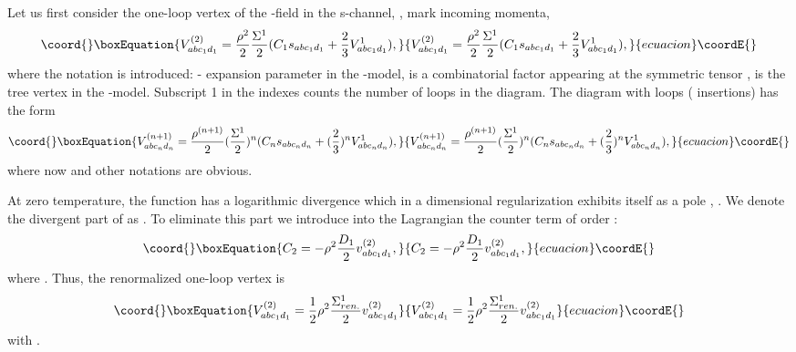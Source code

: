 \documentclass[a4paper,12pt]{article}
\begin{document}
Let us first consider the one-loop vertex of the \myHighlight{$\phi$}\coordHE{}-field in the
s-channel, \coordHE{}, \coordHE{} mark incoming momenta,
\begin{equation}\coord{}\boxEquation{ \label{v1}
V^{(2)}_{abc_1 d_1} = \frac{\rho^2 }{2}\frac{ \Sigma^1}{2} (C_1
s_{abc_1 d_1} + \frac{2}{3} V^1 _{abc_1 d_1}),
}{ V^{(2)}_{abc_1 d_1} = \frac{\rho^2 }{2}\frac{ \Sigma^1}{2} (C_1
s_{abc_1 d_1} + \frac{2}{3} V^1 _{abc_1 d_1}),
}{ecuacion}\coordE{}\end{equation}
where the notation is introduced: \coordHE{} -
expansion parameter in the \coordHE{}-model, \coordHE{} is a combinatorial factor appearing at
the symmetric tensor \coordHE{}, \coordHE{} is the tree vertex in the \coordHE{}-model. Subscript 1
in the indexes \coordHE{} counts the number of loops in the
diagram. The diagram with \coordHE{} loops ( \coordHE{}
insertions) has the form
\begin{equation}\coord{}\boxEquation{ \label{vn}
V^{(n+1)}_{abc_n d_n} = \frac{\rho^{(n+1)} }{2}(\frac{ \Sigma^1}{2})^n
(C_n s_{abc_n d_n} + (\frac{2}{3})^n V^1 _{abc_n d_n}),
}{ V^{(n+1)}_{abc_n d_n} = \frac{\rho^{(n+1)} }{2}(\frac{ \Sigma^1}{2})^n
(C_n s_{abc_n d_n} + (\frac{2}{3})^n V^1 _{abc_n d_n}),
}{ecuacion}\coordE{}\end{equation}
where now \coordHE{} and other notations are obvious.

At zero temperature, the function \coordHE{} has a logarithmic
divergence which in a dimensional regularization exhibits itself as a
pole \coordHE{}, \coordHE{}. We denote the
divergent part of \coordHE{} as \coordHE{}. To eliminate this part we
introduce into the Lagrangian the counter term \coordHE{} of order
\coordHE{}:
\begin{equation}\coord{}\boxEquation{ \label{C2}
C_2 = - \rho^2 \frac{D_1}{2} v^{(2)}_{abc_1 d_1},
}{ C_2 = - \rho^2 \frac{D_1}{2} v^{(2)}_{abc_1 d_1},
}{ecuacion}\coordE{}\end{equation}
where \coordHE{}. Thus, the renormalized one-loop vertex is
\begin{equation}\coord{}\boxEquation{ \label{v1r}
V^{(2)}_{abc_1 d_1} = \frac{1}{2} \rho^2 \frac{\Sigma^1_{ren.}}{2}
 v^{(2)}_{abc_1 d_1}
}{ V^{(2)}_{abc_1 d_1} = \frac{1}{2} \rho^2 \frac{\Sigma^1_{ren.}}{2}
 v^{(2)}_{abc_1 d_1}
}{ecuacion}\coordE{}\end{equation}
with \coordHE{}. 
\end{document}
